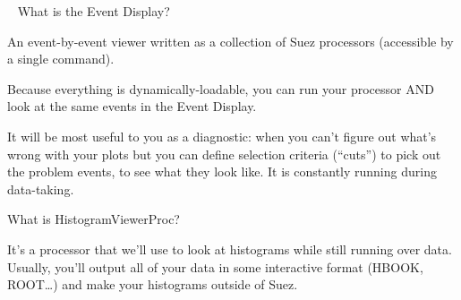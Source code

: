 \documentclass[landscape]{article}
\newenvironment{slide}{\mbox{ }\vfill}{\vfill \mbox{ } \pagebreak}
\begin{document}
\begin{slide}
What is the Event Display?

\vspace{0.5 cm}
\begin{center}
  \begin{minipage}{0.9\linewidth}
    An event-by-event viewer written as a collection of Suez
    processors (accessible by a single command).

    \vspace{0.8 cm}
    Because everything is dynamically-loadable, you can run your
    processor AND look at the same events in the Event Display.

    \vspace{0.8 cm}
    It will be most useful to you as a diagnostic: when you can't
    figure out what's wrong with your plots but you can define
    selection criteria (``cuts'') to pick out the problem events, to
    see what they look like.  It is constantly running during
    data-taking.
  \end{minipage}
\end{center}

\vspace{0.8 cm}
What is HistogramViewerProc?

\vspace{0.5 cm}
\begin{center}
  \begin{minipage}{0.9\linewidth}
    It's a processor that we'll use to look at histograms while still
    running over data.  Usually, you'll output all of your data in
    some interactive format (HBOOK, ROOT\ldots) and make your
    histograms outside of Suez.
  \end{minipage}
\end{center}
\end{slide}
\end{document}
